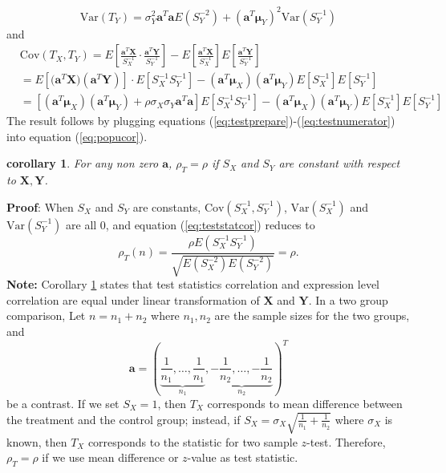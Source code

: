 \documentclass[12pt, a4paper]{article}
\newtheorem{corollary}{corollary}
\newcommand{\cov}{\text{Cov}}
\newcommand{\var}{\text{Var}}
\begin{document}
	\begin{equation}\label{eq:testdenom2}
	\var(T_Y)= \sigma_Y^2\bm a^T\bm a E(S_Y^{-2}) + (\bm a^T\bm \mu_Y)^2\var(S_Y^{-1})
	\end{equation}
	and
	\begin{equation}\label{eq:testnumerator}
	\begin{aligned}
		&\cov(T_X, T_Y) = E\left[\frac{ \bm a^T\bm X }{S_X^{-1}}\cdot\frac{ \bm a^T\bm Y }{S_Y^{-1}}\right] - E\left[\frac{\bm a^T\bm X}{S_X^{-1}}\right]E\left[\frac{\bm a^T\bm Y}{S_Y^{-1}}\right] \\
			 & = E[\bm (\bm a^T\bm X)(\bm a^T\bm Y)]\cdot E[S_X^{-1}S_Y^{-1}]-(\bm a^T\bm \mu_X)(\bm a^T\bm \mu_Y)E[S_X^{-1}]E[S_Y^{-1}]\\
			 & = [(\bm a^T\bm \mu_X)(\bm a^T\bm \mu_Y)+ \rho \sigma_X\sigma_Y\bm a^T\bm a]E[S_X^{-1}S_Y^{-1}]- (\bm a^T\bm \mu_X)(\bm a^T\bm \mu_Y)E[S_X^{-1}]E[S_Y^{-1}]
	\end{aligned}
	\end{equation}	
	The result follows by plugging equations (\ref{eq:testprepare})-(\ref{eq:testnumerator}) into equation (\ref{eq:popucor}).
	
	\begin{corollary}\label{thm:lineartransformation} 
		For any non zero $\bm a$, $\rho_T=\rho$ if $S_X$ and $S_Y$ are constant with respect to $\bm X, \bm Y$. 
	\end{corollary}
	\textbf{Proof}: When $S_X$ and $S_Y$ are constants, $\cov(S_X^{-1}, S_Y^{-1})$, $\var(S_X^{-1}) $ and $\var(S_Y^{-1})$ are all 0, and equation (\ref{eq:teststatcor}) reduces to 
	\begin{equation}
		\rho_T(n) = \frac{\rho E(S_X^{-1}S_Y^{-1})}{\sqrt{E(S_X^{-2})E(S_Y^{-2})}} = \rho.
	\end{equation}
	\textbf{Note:} Corollary \ref{thm:lineartransformation} states that test statistics correlation and expression level correlation are equal under linear transformation of $\bm X$ and $\bm Y$. In a two group comparison, Let $n = n_1 + n_2$ where $n_1, n_2$ are the sample sizes for the two groups, and 
	\begin{equation}\label{eq:contrast}
	\bm a  = (\underbrace{\frac{1}{n_1}, \ldots, \frac{1}{n_1}}_{n_1}, \underbrace{-\frac{1}{n_2}, \ldots, -\frac{1}{n_2}}_{n_2})^T
	\end{equation}
 be a contrast. If we set $S_X=1$, then $T_X$ corresponds to mean difference between the treatment and the control group; instead, if $S_X = \sigma_X\sqrt{\frac{1}{n_1} + \frac{1}{n_2}}$ where $\sigma_X$ is known, then $T_X$ corresponds to the statistic for two sample $z$-test. Therefore, $\rho_T=\rho$ if we use mean difference or $z$-value as test statistic.
	
\end{document}
